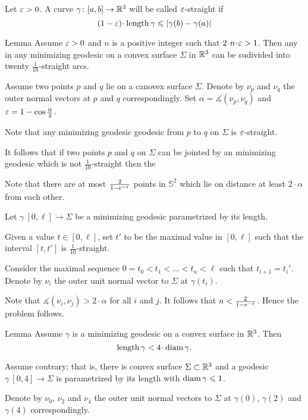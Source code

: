 \documentclass[a4paper,10pt]{amsart}
\begin{document}
Let $\varepsilon>0$.
A curve $\gamma\colon[a,b]\to\mathbb{R}^3$ will be called $\varepsilon$-straight
if 
\[(1-\eps)\cdot\length \gamma\le |\gamma(b)-\gamma(a)|\]

\begin{thm}{Lemma}\label{lem:eps-straight}
Assume $\varepsilon>0$ 
and $n$ is a positive integer such that
$2\cdot n\cdot\eps>1$.
Then any 
in any minimizing geodesic
on a convex surface $\Sigma$ in $\mathbb{R}^3$
can be sudivided into twenty  $\tfrac1{10}$-straight arcs.
\end{thm}

Assume two points $p$ and $q$ lie on a canovex surface $\Sigma$.
Denote by $\nu_p$ and $\nu_q$ the outer normal vectors at $p$ and $q$ correspondingly.
Set $\alpha=\measuredangle(\nu_p,\nu_q)$ and  $\varepsilon=1-\cos\tfrac\alpha2$.

Note that any minimizing geodesic geodesic from $p$ to $q$ on $\Sigma$
is $\varepsilon$-straight.

It follows that if two points $p$ and $q$ on $\Sigma$ can be jointed by an minimizing geodesic which is not $\tfrac1{10}$-straight
then the 

Note that there are at most $\tfrac2{1-e^{-\varepsilon}}$ points in $\mathbb S^2$ which lie on distance at least $2\cdot\alpha$ from each other.

Let $\gamma\:[0,\ell]\to \Sigma$ be a minimizing geodesic parametrized by its length.

Given a value $t\in [0,\ell]$,
set $t'$ to be the maximal value in $[0,\ell]$ such that the interval $[t,t']$ is $\tfrac1{10}$-straight.

Consider the maximal sequence $0=t_0<t_1<\dots<t_n<\ell$
such that $t_{i+1}=t_i'$.
Denote by $\nu_i$ the outer unit normal vector to $\Sigma$ at $\gamma(t_i)$. 

Note that $\measuredangle(\nu_i,\nu_j)>2\cdot\alpha$ for all $i$ and $j$.
It follows that $n<\tfrac2{1-e^{-\varepsilon}}$.
Hence the problem follows.
\qeds


\begin{thm}{Lemma}\label{lem:diam-length}
Assume $\gamma$ is a minimizing geodesic on a convex surface in $\mathbb{R}^3$.
Then 
\[\length\gamma< 4\cdot\diam \gamma.\]
\end{thm}

Assume contrary;
that is, 
there is convex surface $\Sigma\subset\mathbb{R}^3$
and a geodesic $\gamma\:[0,4]\to \Sigma$ 
is parametrized by its length with $\operatorname{diam} \gamma\leqslant 1$.

Denote by $\nu_0$, $\nu_2$ and $\nu_4$ the outer unit normal vectors
to $\Sigma$ at $\gamma(0)$, $\gamma(2)$ and $\gamma(4)$ correspondingly.
\end{document}
